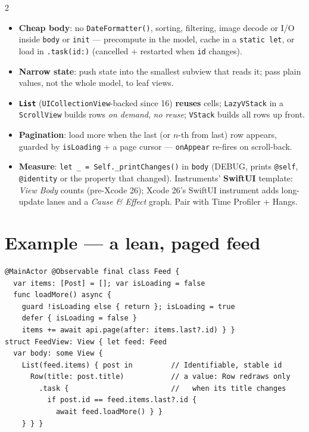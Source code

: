 \documentclass[8pt]{extarticle}
\begin{document}
\begin{multicols}{2}
\begin{itemize}
  \item \textbf{Cheap body}: no \texttt{DateFormatter()}, sorting, filtering, image decode or I/O inside
        \texttt{body} or \texttt{init} — precompute in the model, cache in a \texttt{static let}, or load in
        \texttt{.task(id:)} (cancelled + restarted when \texttt{id} changes).
  \item \textbf{Narrow state}: push state into the smallest subview that reads it; pass plain values, not the
        whole model, to leaf views.
  \item \textbf{\texttt{List}} (\texttt{UICollectionView}-backed since 16) \textbf{reuses} cells\unverified; \texttt{LazyVStack}
        in a \texttt{ScrollView} builds rows \emph{on demand}, \emph{no reuse}\unverified; \texttt{VStack} builds all rows up front.
  \item \textbf{Pagination}: load more when the last (or $n$-th from last) row appears, guarded by
        \texttt{isLoading} + a page cursor — \texttt{onAppear} re-fires on scroll-back.
  \item \textbf{Measure}: \texttt{let \_ = Self.\_printChanges()} in \texttt{body} (DEBUG, prints
        \texttt{@self}, \texttt{@identity} or the property that changed). Instruments' \textbf{SwiftUI}
        template: \emph{View Body} counts (pre-Xcode 26); Xcode 26's SwiftUI instrument adds long-update lanes and a
        \emph{Cause \& Effect} graph. Pair with Time Profiler + Hangs.
\end{itemize}

\section{Example — a lean, paged feed}
\begin{lstlisting}[language=SwiftSheet]
@MainActor @Observable final class Feed {
  var items: [Post] = []; var isLoading = false
  func loadMore() async {
    guard !isLoading else { return }; isLoading = true
    defer { isLoading = false }
    items += await api.page(after: items.last?.id) } }
struct FeedView: View { let feed: Feed
  var body: some View {
    List(feed.items) { post in         // Identifiable, stable id
      Row(title: post.title)           // a value: Row redraws only
        .task {                        //   when its title changes
          if post.id == feed.items.last?.id {
            await feed.loadMore() } }
    } } }
\end{lstlisting}

\columnbreak


\end{multicols}
\end{document}
